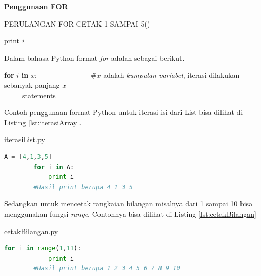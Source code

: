 \begin{contoh}
	\textbf{Penggunaan FOR}
	\begin{algorithm}
	\caption{PERULANGAN-FOR-CETAK-1-SAMPAI-5()}
		\begin{algorithmic}[1]
			\STATE print $i$
		\ENDFOR
		\STATE{}
		\STATE{}
		\end{algorithmic}
	\end{algorithm}
\end{contoh}

Dalam bahasa Python format \textit{for} adalah sebagai berikut.
\begin{tabbing}
\textbf{for} $i$ \textbf{in} $x$:~~~~~~~~~~~~~~~\=\#$x$ adalah \textit{kumpulan variabel}, iterasi dilakukan sebanyak panjang $x$\\
~~~~~statements\\
\end{tabbing}

Contoh penggunaan format Python untuk iterasi isi dari List bisa dilihat di Listing \ref{lst:iterasiArray}.
\begin{listprog}{iterasiList.py}
	\label{lst:iterasiArray}
	\begin{lstlisting}[language=Python]
		A = [4,1,3,5]
		for i in A:
			print i
		#Hasil print berupa 4 1 3 5
	\end{lstlisting}
\end{listprog}

Sedangkan untuk mencetak rangkaian bilangan misalnya dari 1 sampai 10 bisa menggunakan fungsi \textit{range}. Contohnya bisa dilihat di Listing \ref{lst:cetakBilangan}
\begin{listprog}{cetakBilangan.py}
	\label{lst:cetakBilangan}
	\begin{lstlisting}[language=Python]
		for i in range(1,11):
			print i
		#Hasil print berupa 1 2 3 4 5 6 7 8 9 10
	\end{lstlisting}
\end{listprog}

